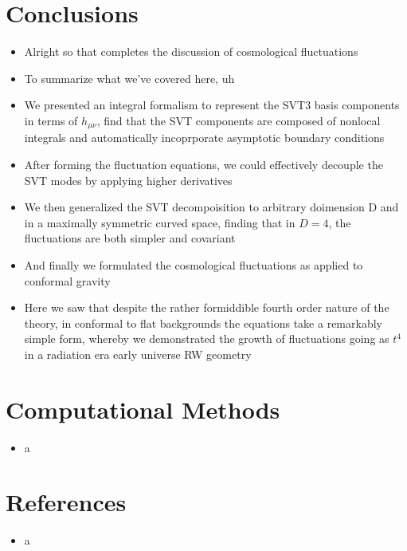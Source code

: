 \documentclass[10pt,letterpaper]{article}
\numberwithin{equation}{section}
\begin{document}
\section{Conclusions}
\begin{itemize}
	\item Alright so that completes the discussion of cosmological fluctuations
	\item To summarize what we've covered here, uh
	\item We presented an integral formalism to represent the SVT3 basis components in terms of $h_{\mu\nu}$, find that the SVT components are composed of nonlocal integrals and automatically incoprporate asymptotic boundary conditions
	\item After forming the fluctuation equations, we could effectively decouple the SVT modes by applying higher derivatives
	\item We then generalized the SVT decompoisition to arbitrary doimension D and in a maximally symmetric curved space, finding that in $D=4$, the fluctuations are both simpler and covariant
	\item And finally we formulated the cosmological fluctuations as applied to conformal gravity
	\item Here we saw that despite the rather formiddible fourth order nature of the theory, in conformal to flat backgrounds the equations take a remarkably simple form, whereby we demonstrated the growth of fluctuations going as $t^4$ in a radiation era early universe RW geometry
\end{itemize}


\section{Computational Methods}
\begin{itemize}
	\item a
\end{itemize}


\section{References}
\begin{itemize}
	\item a
\end{itemize}
\end{document}
